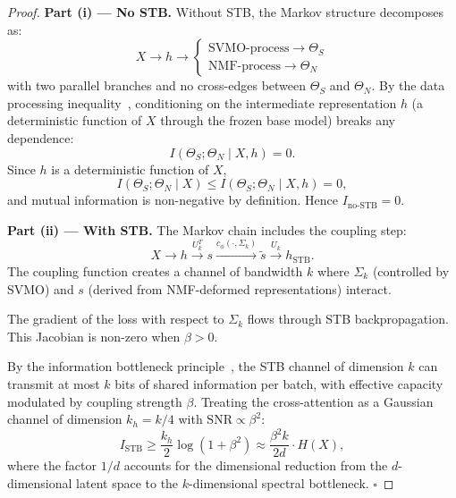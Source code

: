 \documentclass{scpe}
\begin{document}
\begin{proof}
\textbf{Part (i) --- No STB.}
Without STB, the Markov structure decomposes as:
\begin{equation}
X \to h \to 
\begin{cases}
\text{SVMO-process} \to \Theta_S \\
\text{NMF-process} \to \Theta_N
\end{cases}
\end{equation}
with two parallel branches and no cross-edges between $\Theta_S$ and $\Theta_N$. By the data processing inequality~\cite{cover2006elements}, conditioning on the intermediate representation $h$ (a deterministic function of $X$ through the frozen base model) breaks any dependence:
\begin{equation}
I(\Theta_S; \Theta_N \mid X, h) = 0.
\end{equation}
Since $h$ is a deterministic function of $X$,
\begin{equation}
I(\Theta_S; \Theta_N \mid X) \leq I(\Theta_S; \Theta_N \mid X, h) = 0,
\end{equation}
and mutual information is non-negative by definition. Hence $I_{\text{no-STB}} = 0$.

\textbf{Part (ii) --- With STB.}
The Markov chain includes the coupling step:
\begin{equation}
X \to h \xrightarrow{U_k^T} s \xrightarrow{c_\phi(\cdot, \Sigma_k)} \tilde{s} \xrightarrow{U_k} h_{\text{STB}}.
\end{equation}
The coupling function creates a channel of bandwidth $k$ where $\Sigma_k$ (controlled by SVMO) and $s$ (derived from NMF-deformed representations) interact.

The gradient of the loss with respect to $\Sigma_k$ flows through STB backpropagation. This Jacobian is non-zero when $\beta > 0$.

By the information bottleneck principle~\cite{tishby1999information}, the STB channel of dimension $k$ can transmit at most $k$ bits of shared information per batch, with effective capacity modulated by coupling strength $\beta$. Treating the cross-attention as a Gaussian channel of dimension $k_h = k/4$ with $\text{SNR} \propto \beta^2$:
\begin{equation}
I_{\text{STB}} \geq \frac{k_h}{2}\log(1 + \beta^2) \approx \frac{\beta^2 k}{2d} \cdot H(X),
\end{equation}
where the factor $1/d$ accounts for the dimensional reduction from the $d$-dimensional latent space to the $k$-dimensional spectral bottleneck. $\square$
\end{proof}
\end{document}
